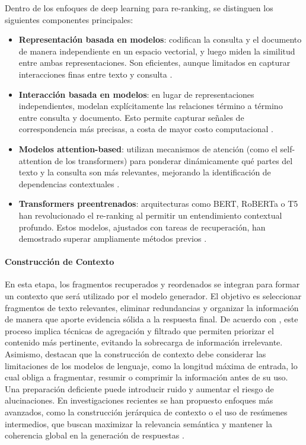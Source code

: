 Dentro de los enfoques de deep learning para re-ranking, se distinguen los siguientes componentes principales:

\begin{itemize}
    \item \textbf{Representación basada en modelos}: codifican la consulta y el documento de manera independiente en un espacio vectorial, y luego miden la similitud entre ambas representaciones. Son eficientes, aunque limitados en capturar interacciones finas entre texto y consulta \parencite{minaee2021}.
    
    \item \textbf{Interacción basada en modelos}: en lugar de representaciones independientes, modelan explícitamente las relaciones término a término entre consulta y documento. Esto permite capturar señales de correspondencia más precisas, a costa de mayor costo computacional \parencite{jiang2024textmatching}.
    
    \item \textbf{Modelos attention-based}: utilizan mecanismos de atención (como el self-attention de los transformers) para ponderar dinámicamente qué partes del texto y la consulta son más relevantes, mejorando la identificación de dependencias contextuales \parencite{hambarde2023ir}.
    
    \item \textbf{Transformers preentrenados}: arquitecturas como BERT, RoBERTa o T5 han revolucionado el re-ranking al permitir un entendimiento contextual profundo. Estos modelos, ajustados con tareas de recuperación, han demostrado superar ampliamente métodos previos \parencite{zhai2024llmIR}.
\end{itemize}

\paragraph{Construcción de Contexto}  
En esta etapa, los fragmentos recuperados y reordenados se integran para formar un contexto que será utilizado por el modelo generador. El objetivo es seleccionar 
fragmentos de texto relevantes, eliminar redundancias y organizar la información de manera que aporte evidencia sólida a la respuesta final. De acuerdo con 
\textcite{sarthi2024raptor}, este proceso implica técnicas de agregación y filtrado que permiten priorizar el contenido más pertinente, evitando 
la sobrecarga de información irrelevante. Asimismo, \textcite{gao2023rag} destacan que la construcción de contexto debe considerar las limitaciones de los modelos 
de lenguaje, como la longitud máxima de entrada, lo cual obliga a fragmentar, resumir o comprimir la información antes de su uso. Una preparación deficiente puede introducir ruido y
aumentar el riesgo de alucinaciones.  
En investigaciones recientes se han propuesto enfoques más avanzados, como la construcción jerárquica de contexto o el uso de resúmenes intermedios, que 
buscan maximizar la relevancia semántica y mantener la coherencia global en la generación de respuestas \parencite{hambarde2023ir}.

